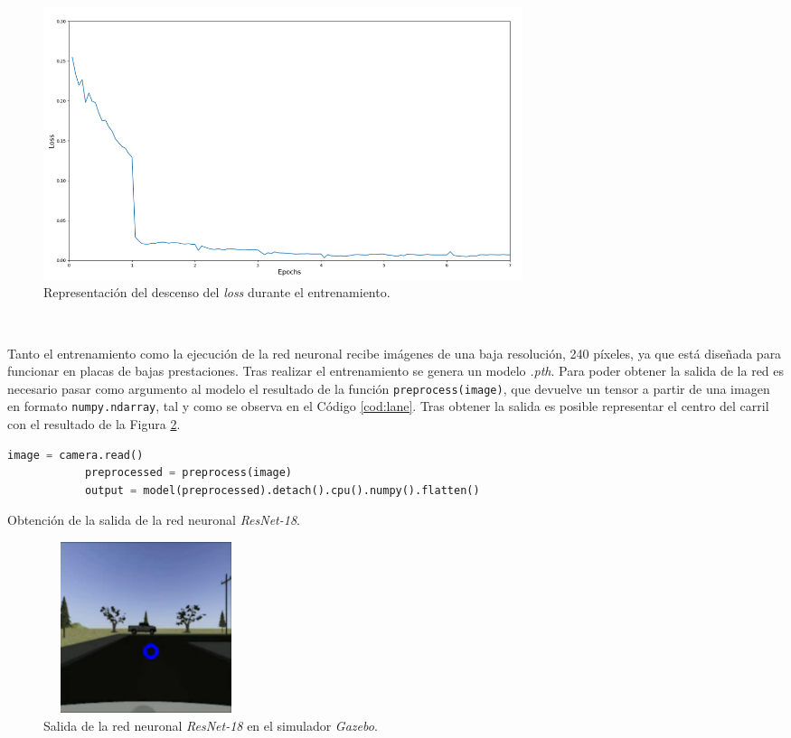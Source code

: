 \begin{figure} [h!]
	\begin{center}
		\includegraphics[width=14cm]{figs/simgraphepoch}
	\end{center}
	\caption{Representación del descenso del \textit{loss} durante el entrenamiento.}
	\label{fig:simgraphepoch}
\end{figure}\


Tanto el entrenamiento como la ejecución de la red neuronal recibe imágenes de una baja resolución, 240 píxeles, ya que está diseñada para funcionar en placas de bajas prestaciones. Tras realizar el entrenamiento se genera un modelo \textit{.pth}. Para poder obtener la salida de la red es necesario pasar como argumento al modelo el resultado de la función \verb|preprocess(image)|, que devuelve un tensor a partir de una imagen en formato \verb|numpy.ndarray|, tal y como se observa en el Código \ref{cod:lane}. Tras obtener la salida es posible representar el centro del carril con el resultado de la Figura \ref{fig:outputnnsim}.\\

\begin{code}[h]
	\begin{lstlisting}[language=Python]
			image = camera.read()
    		preprocessed = preprocess(image)
    		output = model(preprocessed).detach().cpu().numpy().flatten()
	\end{lstlisting}
	\caption[Obtención de la salida de la red neuronal \textit{ResNet-18}.]{Obtención de la salida de la red neuronal \textit{ResNet-18}.}
	\label{cod:lane}
\end{code}

\begin{figure} [h!]
	\begin{center}
		\includegraphics[width=6cm, height=5cm]{figs/outputNNsim}
	\end{center}
	\caption{Salida de la red neuronal \textit{ResNet-18} en el simulador \textit{Gazebo}.}
	\label{fig:outputnnsim}
\end{figure}\

